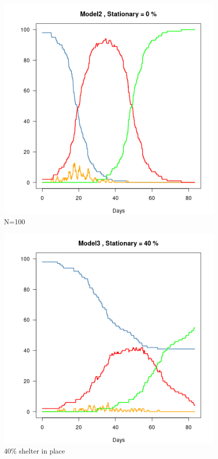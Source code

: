\documentclass{article}\usepackage[]{graphicx}\usepackage[]{color}
\begin{document}
\begin{figure}
\includegraphics[width=1\textwidth]{Model2.png}
\caption{N=100}
\end{figure}

\begin{figure}
\includegraphics[width=1\textwidth]{Model3.png}
\caption{40\% shelter in place}
\end{figure}
\end{document}
